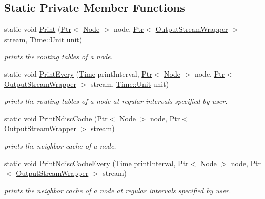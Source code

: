 \subsection*{Static Private Member Functions}
\begin{DoxyCompactItemize}
\item 
static void \hyperlink{classns3_1_1Ipv6RoutingHelper_ac01611050813aedf80458c31d303d3b1}{Print} (\hyperlink{classns3_1_1Ptr}{Ptr}$<$ \hyperlink{classns3_1_1Node}{Node} $>$ node, \hyperlink{classns3_1_1Ptr}{Ptr}$<$ \hyperlink{classns3_1_1OutputStreamWrapper}{Output\+Stream\+Wrapper} $>$ stream, \hyperlink{classns3_1_1Time_a87a7f4d29c68b047a72d291ad660295a}{Time\+::\+Unit} unit)
\begin{DoxyCompactList}\small\item\em prints the routing tables of a node. \end{DoxyCompactList}\item 
static void \hyperlink{classns3_1_1Ipv6RoutingHelper_affe6938b3ce8f3590a382c6ba8d8dd74}{Print\+Every} (\hyperlink{classns3_1_1Time}{Time} print\+Interval, \hyperlink{classns3_1_1Ptr}{Ptr}$<$ \hyperlink{classns3_1_1Node}{Node} $>$ node, \hyperlink{classns3_1_1Ptr}{Ptr}$<$ \hyperlink{classns3_1_1OutputStreamWrapper}{Output\+Stream\+Wrapper} $>$ stream, \hyperlink{classns3_1_1Time_a87a7f4d29c68b047a72d291ad660295a}{Time\+::\+Unit} unit)
\begin{DoxyCompactList}\small\item\em prints the routing tables of a node at regular intervals specified by user. \end{DoxyCompactList}\item 
static void \hyperlink{classns3_1_1Ipv6RoutingHelper_a582eac0a7c42f77cdc5b8319f1c25897}{Print\+Ndisc\+Cache} (\hyperlink{classns3_1_1Ptr}{Ptr}$<$ \hyperlink{classns3_1_1Node}{Node} $>$ node, \hyperlink{classns3_1_1Ptr}{Ptr}$<$ \hyperlink{classns3_1_1OutputStreamWrapper}{Output\+Stream\+Wrapper} $>$ stream)
\begin{DoxyCompactList}\small\item\em prints the neighbor cache of a node. \end{DoxyCompactList}\item 
static void \hyperlink{classns3_1_1Ipv6RoutingHelper_a6b83234c9aa93f14576ba9f12c87a64b}{Print\+Ndisc\+Cache\+Every} (\hyperlink{classns3_1_1Time}{Time} print\+Interval, \hyperlink{classns3_1_1Ptr}{Ptr}$<$ \hyperlink{classns3_1_1Node}{Node} $>$ node, \hyperlink{classns3_1_1Ptr}{Ptr}$<$ \hyperlink{classns3_1_1OutputStreamWrapper}{Output\+Stream\+Wrapper} $>$ stream)
\begin{DoxyCompactList}\small\item\em prints the neighbor cache of a node at regular intervals specified by user. \end{DoxyCompactList}\end{DoxyCompactItemize}


